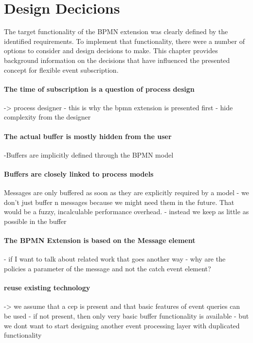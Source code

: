 \section{Design Decicions}\label{ch:designdecisions}

The target functionality of the BPMN extension was clearly defined by the identified requirements.
To implement that functionality, there were a number of options to consider and design decisions to make.
This chapter provides background information on the decisions that have influenced the presented concept for flexible event subscription.


\paragraph{The time of subscription is a question of process design}
-> process designer
- this is why the bpmn extension is presented first
- hide complexity from the designer

\paragraph{The actual buffer is mostly hidden from the user}

-Buffers are implicitly defined through the BPMN model

\paragraph{Buffers are closely linked to process models}
Messages are only buffered as soon as they are explicitly required by a model
- we don't just buffer n messages because we might need them in the future. That would be a fuzzy, incalculable performance overhead.
- instead we keep as little as possible in the buffer

\paragraph{The BPMN Extension is based on the Message element}
- if I want to talk about related work that goes another way
- why are the policies a parameter of the message and not the catch event element?

\paragraph{reuse existing technology}
-> we assume that a cep is present and that basic features of event queries can be used
- if not present, then only very basic buffer functionality is available
- but we dont want to start designing another event processing layer with duplicated functionality
